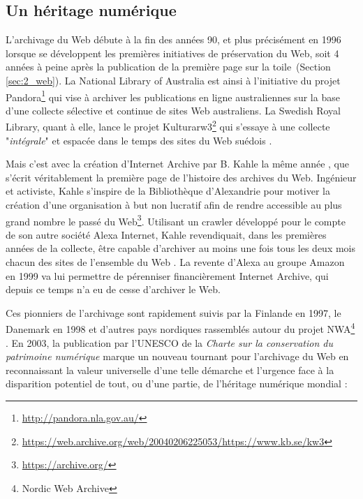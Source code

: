 \documentclass[symmetric,justified,marginals=raggedouter]{tufte-book}
\begin{document}
\subsection{Un héritage numérique}

\noindent L'archivage du Web débute à la fin des années 90, et plus précisément en 1996 lorsque se développent les premières initiatives de préservation du Web, soit 4 années à peine après la publication de la première page sur la toile~(Section \ref{sec:2_web}). La National Library of Australia est ainsi à l'initiative du projet Pandora\footnote{\url{http://pandora.nla.gov.au/}} qui vise à archiver les publications en ligne australiennes sur la base d'une collecte sélective et continue de sites Web australiens. La Swedish Royal Library, quant à elle, lance le projet Kulturarw3\footnote{\url{https://web.archive.org/web/20040206225053/https://www.kb.se/kw3}} qui s'essaye à une collecte "\textit{intégrale}" et espacée dans le temps des sites du Web suédois \citep{arvidson_kulturarw3_2000}.

Mais c'est avec la création d'Internet Archive par B. Kahle la même année \citep{kahle_preserving_1997}, que s'écrit véritablement la première page de l'histoire des archives du Web. Ingénieur et activiste, Kahle s'inspire de la Bibliothèque d'Alexandrie pour motiver la création d'une organisation à but non lucratif afin de rendre accessible au plus grand nombre le passé du Web\footnote{\url{https://archive.org/}}. Utilisant un crawler développé pour le compte de son autre société Alexa Internet, Kahle revendiquait, dans les premières années de la collecte, être capable d'archiver au moins une fois tous les deux mois chacun des sites de l'ensemble du Web \citep{mohr_introduction_2004}. La revente d'Alexa au groupe Amazon en 1999 va lui permettre de pérenniser financièrement Internet Archive, qui depuis ce temps n'a eu de cesse d'archiver le Web.

Ces pionniers de l'archivage sont rapidement suivis par la Finlande en 1997, le Danemark en 1998 et d'autres pays nordiques rassemblés autour du projet NWA\footnote{Nordic Web Archive} \citep{hallgrinsson_nordic_2003}. En 2003, la publication par l'UNESCO de la \textit{Charte sur la conservation du patrimoine numérique} \citep{unesco_charter_2003} marque un nouveau tournant pour l'archivage du Web en reconnaissant la valeur universelle d'une telle démarche et l'urgence face à la disparition potentiel de tout, ou d'une partie, de l'héritage numérique mondial : \\
\end{document}
